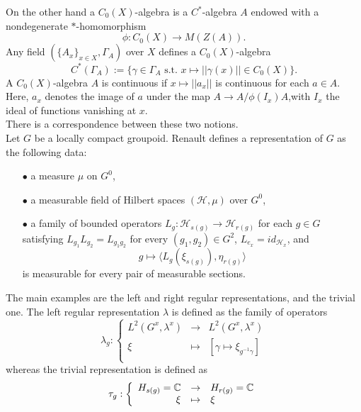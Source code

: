 On the other hand a $C_0(X)$-algebra is a $C^*$-algebra $A$ endowed with a nondegenerate $*$-homomorphism 
\[\phi : C_0(X) \rightarrow M(Z(A)). \]
Any field $\left( \{ A_x \}_{x\in X} , \Gamma_A \right) $ over $X$ defines a $C_0(X)$-algebra 
\[C^*(\Gamma_A) := \{\gamma\in \Gamma_A \text{ s.t. } x\mapsto ||\gamma(x) || \in C_0(X)\}.\]
A $C_0(X)$-algebra $A$ is continuous if $x\mapsto || a_x||$ is continuous for each $a\in A$. Here, $a_x$ denotes the image of $a$ under the map $A \rightarrow A / \phi(I_x)A$,with $I_x$ the ideal of functions vanishing at $x$.\\

There is a correspondence between these two notions.\\

Let $G$ be a locally compact groupoid. Renault defines a representation of $G$ as the following data:\\

\begin{itemize}
\item[$\bullet$] a measure $\mu$ on $G^0$,\\
\item[$\bullet$] a measurable field of Hilbert spaces $(\mathcal H , \mu)$ over $G^0$,\\
\item[$\bullet$] a family of bounded operators $L_g : \mathcal H_{s(g)} \rightarrow \mathcal H_{r(g)}$ for each $g\in G$ satisfying $L_{g_1} L_{g_2} = L_{g_1 g_2}$ for every $(g_1,g_2)\in G^2$, $L_{e_x}= id_{\mathcal H_x}$, and 
\[g\mapsto \langle L_g(\xi_{s(g)}) , \eta_{r(g)} \rangle \] 
is measurable for every pair of measurable sections. \\
\end{itemize}

The main examples are the left and right regular representations, and the trivial one. The left regular representation $\lambda$ is defined as
the family of operators
\[\lambda_g : \left\{ \begin{array}{rcl}
L^2(G^x,\lambda^x) & \rightarrow & L^2(G^x,\lambda^x) \\
\xi & \mapsto & [\gamma \mapsto \xi_{g^{-1}\gamma}] \\
\end{array}\right.\]
whereas the trivial representation is defined as 
\[\tau_g : \left\{ \begin{array}{rcl}
H_{s(g)}=\mathbb C & \rightarrow & H_{r(g)} = \mathbb C \\
\xi & \mapsto &  \xi\\
\end{array}\right.\]

